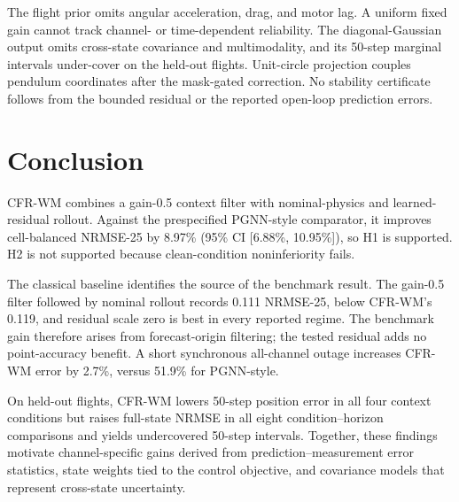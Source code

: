 \documentclass[iicol,pdflatex,sn-basic,Numbered]{sn-jnl}
\newcommand{\PrimaryImprovement}{8.97}
\newcommand{\PrimaryRelativeCILow}{6.88}
\newcommand{\PrimaryRelativeCIHigh}{10.95}
\begin{document}
The flight prior omits angular acceleration, drag, and motor lag. A uniform
fixed gain cannot track channel- or time-dependent reliability. The
diagonal-Gaussian output omits cross-state covariance and multimodality, and its
50-step marginal intervals under-cover on the held-out flights. Unit-circle
projection couples pendulum coordinates after the mask-gated correction. No
stability certificate follows from the bounded residual or the reported
open-loop prediction errors.

\section{Conclusion}

CFR-WM combines a gain-0.5 context filter with nominal-physics and learned-
residual rollout. Against the prespecified PGNN-style comparator, it improves
cell-balanced NRMSE-25 by \PrimaryImprovement\% (95\% CI
[\PrimaryRelativeCILow\%, \PrimaryRelativeCIHigh\%]), so H1 is supported. H2
is not supported because clean-condition noninferiority fails.

The classical baseline identifies the source of the benchmark result.
The gain-0.5 filter followed by nominal rollout records 0.111 NRMSE-25, below
CFR-WM's 0.119, and residual scale zero is best in every reported regime.
The benchmark gain therefore arises from forecast-origin filtering; the tested
residual adds no point-accuracy benefit.
A short synchronous all-channel outage increases CFR-WM error by 2.7\%, versus
51.9\% for PGNN-style.

On held-out flights, CFR-WM lowers 50-step position error in all four context
conditions but raises full-state NRMSE in all eight condition--horizon
comparisons and yields undercovered 50-step intervals. Together, these findings
motivate channel-specific gains derived from prediction--measurement error
statistics, state weights tied to the control objective, and covariance models
that represent cross-state uncertainty.
\end{document}

